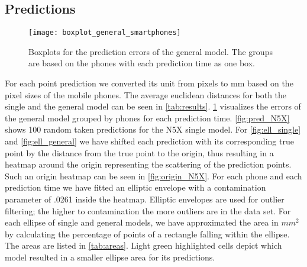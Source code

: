 \subsection{Predictions}
\begin{figure}[t]
	\texttt{[image: boxplot\_general\_smartphones]}
	\caption{Boxplots for the prediction errors of the general model. The groups are based on the phones with each prediction time as one box.}
	\label{fig:boxplots_general}
\end{figure}
For each point prediction we converted its unit from pixels to mm based on the pixel sizes of the mobile phones.
The average euclidean distances for both the single and the general model can be seen in \cref{tab:results}.
\cref{fig:boxplots_general} visualizes the errors of the general model grouped by phones for each prediction time.
\cref{fig:pred_N5X} shows 100 random taken predictions for the N5X single model.
For \cref{fig:ell_single} and \cref{fig:ell_general} we have shifted each prediction with its corresponding true point by the distance from the true point to the origin, thus resulting in a heatmap around the origin representing the scattering of the prediction points.
Such an origin heatmap can be seen in \cref{fig:origin_N5X}.
For each phone and each prediction time we have fitted an elliptic envelope with a contamination parameter of .0261 inside the heatmap.
Elliptic envelopes are used for outlier filtering; the higher to contamination the more outliers are in the data set.
For each ellipse of single and general models, we have approximated the area in $mm^{2}$ by calculating the percentage of points of a rectangle falling within the ellipse. 
The areas are listed in \cref{tab:areas}.
Light green highlighted cells depict which model resulted in a smaller ellipse area for its predictions.
